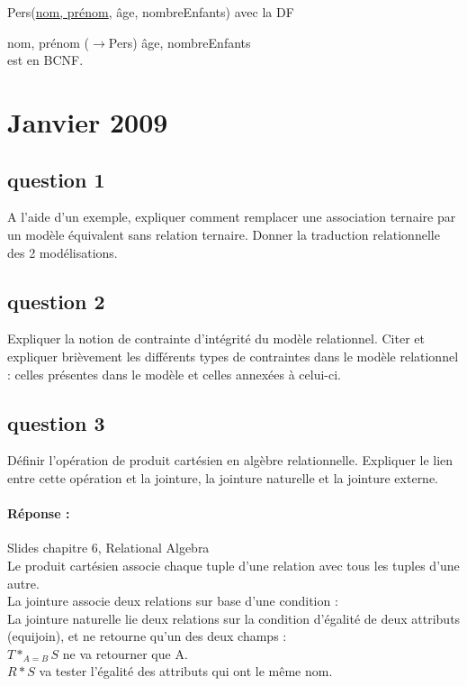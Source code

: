 Pers(\underline{nom, prénom}, âge, nombreEnfants) avec la DF

nom, prénom ($\rightarrow$Pers) âge, nombreEnfants\\
est en BCNF.\\

\section{Janvier 2009}

\subsection{question 1}
A l’aide d’un exemple, expliquer comment remplacer une association ternaire par un modèle
équivalent sans relation ternaire. Donner la traduction relationnelle des 2 modélisations.

\subsection{question 2}
Expliquer la notion de contrainte d’intégrité du modèle relationnel. Citer et expliquer brièvement
les différents types de contraintes dans le modèle relationnel : celles présentes dans le modèle
et celles annexées à celui-ci.

\subsection{question 3}

Définir l’opération de produit cartésien en algèbre relationnelle. Expliquer le lien entre cette
opération et la jointure, la jointure naturelle et la jointure externe.

\paragraph{Réponse :} Slides chapitre 6, Relational Algebra\\
Le produit cartésien associe chaque tuple d'une relation avec 
tous les tuples d'une autre. \\
La jointure associe deux relations sur base d'une condition : \\
La jointure naturelle lie deux relations sur la condition d'égalité de deux 
attributs (equijoin), et ne retourne qu'un des deux champs :\\
$T*_{A=B}S$ ne va retourner que A. \\
$R*S$ va tester l'égalité des attributs qui ont le même nom.\\

